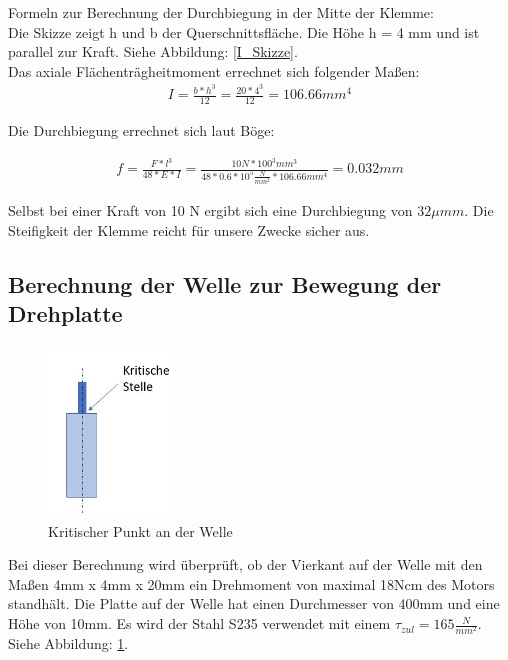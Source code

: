 Formeln zur Berechnung der Durchbiegung in der Mitte der Klemme: \\

Die Skizze zeigt h und b der Querschnittsfläche. Die Höhe h = 4 mm und ist parallel zur Kraft. Siehe Abbildung: \ref{I_Skizze}.\\
Das axiale Flächenträgheitmoment errechnet sich folgender Maßen: 
\begin{align*}
I = \frac{b*h^{3}}{12} = \frac{20*4^{3}}{12} = 106.66mm^{4} 
\end{align*}

Die Durchbiegung errechnet sich laut Böge:

\begin{align*}
f=\frac{ F*l^{ 3 } }{ 48*E*I} = \frac{10N*100^{3}mm^{3}}{48*0.6*10^{5}\frac{N}{mm^{2}}*106.66mm^{4}} = 0.032mm
\end{align*}

Selbst bei einer Kraft von 10 N ergibt sich eine Durchbiegung von $32 \mu mm$. Die Steifigkeit der Klemme reicht für unsere Zwecke sicher aus.


\subsection{Berechnung der Welle zur Bewegung der Drehplatte}

\begin{figure}
\vspace{-40pt}
  \begin{center}
    \includegraphics[width=0.3\textwidth]{Bilder/Powerpoint/Torsionsmoment}
  \end{center}
  \caption{Kritischer Punkt an der Welle}
  \label{Torsionsmoment}
\end{figure}

Bei dieser Berechnung wird überprüft, ob der Vierkant auf der Welle mit den Maßen 4mm x 4mm x 20mm ein Drehmoment von maximal 18Ncm des Motors standhält. Die Platte auf der Welle hat einen Durchmesser von 400mm und eine Höhe von 10mm. Es wird der Stahl S235 verwendet mit einem $\tau_{zul}=165\frac{N}{mm^{2}}$. Siehe Abbildung: \ref{Torsionsmoment}.\\
\\
\\

